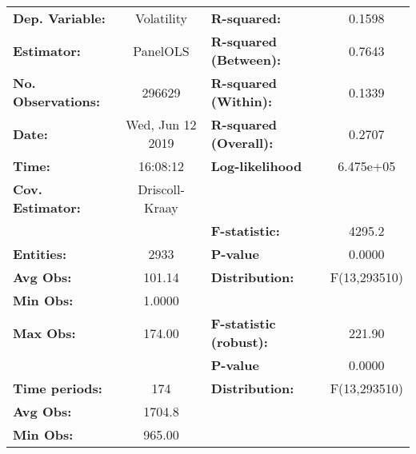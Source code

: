 \begin{center}
\begin{tabular}{lclc}
\toprule
\textbf{Dep. Variable:}                                  &     Volatility     & \textbf{  R-squared:         }   &      0.1598      \\
\textbf{Estimator:}                                      &      PanelOLS      & \textbf{  R-squared (Between):}  &      0.7643      \\
\textbf{No. Observations:}                               &       296629       & \textbf{  R-squared (Within):}   &      0.1339      \\
\textbf{Date:}                                           &  Wed, Jun 12 2019  & \textbf{  R-squared (Overall):}  &      0.2707      \\
\textbf{Time:}                                           &      16:08:12      & \textbf{  Log-likelihood     }   &    6.475e+05     \\
\textbf{Cov. Estimator:}                                 &   Driscoll-Kraay   & \textbf{                     }   &                  \\
\textbf{}                                                &                    & \textbf{  F-statistic:       }   &      4295.2      \\
\textbf{Entities:}                                       &        2933        & \textbf{  P-value            }   &      0.0000      \\
\textbf{Avg Obs:}                                        &       101.14       & \textbf{  Distribution:      }   &   F(13,293510)   \\
\textbf{Min Obs:}                                        &       1.0000       & \textbf{                     }   &                  \\
\textbf{Max Obs:}                                        &       174.00       & \textbf{  F-statistic (robust):} &      221.90      \\
\textbf{}                                                &                    & \textbf{  P-value            }   &      0.0000      \\
\textbf{Time periods:}                                   &        174         & \textbf{  Distribution:      }   &   F(13,293510)   \\
\textbf{Avg Obs:}                                        &       1704.8       & \textbf{                     }   &                  \\
\textbf{Min Obs:}                                        &       965.00       & \textbf{                     }   &                  \\

\end{tabular}
\end{center}
